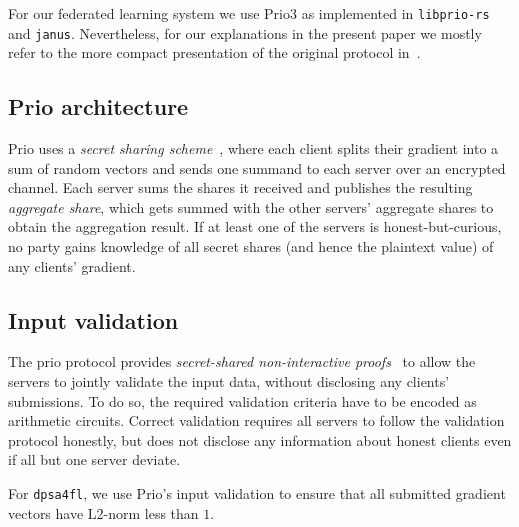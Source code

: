 \documentclass{article}
\begin{document}
For our federated learning system we use Prio3
as implemented in \texttt{libprio-rs} and \texttt{janus}. Nevertheless, for our
explanations in the present paper
we mostly refer to the more compact presentation of the original protocol in~\cite{prio}.

\subsection{Prio architecture}
Prio uses a \textit{secret sharing scheme}~\cite[Step 1 of scheme on page
3]{prio}, where each client splits their gradient into a sum of random vectors
and sends one summand to each server over an encrypted channel. Each server
sums the shares it received and publishes the resulting \textit{aggregate
  share}, which gets summed with the other servers' aggregate shares to obtain
the aggregation result. If at least one of the servers is honest-but-curious,
no party gains knowledge of all secret shares (and hence the plaintext value)
of any clients' gradient.

\subsection{Input validation}
The prio protocol provides \textit{secret-shared non-interactive
  proofs}~\cite[Section 4]{prio} to allow the servers to jointly validate
the input data, without disclosing any clients' submissions. To do so, the
required validation criteria have to be encoded as arithmetic circuits.
Correct validation requires all servers to follow the validation protocol
honestly, but does not disclose any information about honest clients even if all
but one server deviate.

For \texttt{dpsa4fl}, we use Prio's input validation to ensure that all
submitted gradient vectors have L2-norm less than $1$.


%
\end{document}
